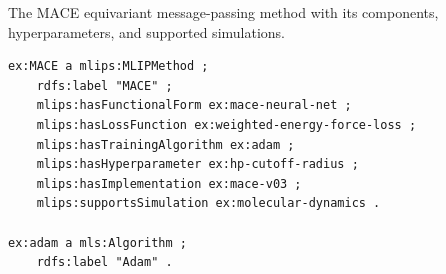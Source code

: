 The MACE equivariant message-passing method with its components, hyperparameters, and supported simulations.
\begin{lstlisting}[language=turtle]
ex:MACE a mlips:MLIPMethod ;
    rdfs:label "MACE" ;
    mlips:hasFunctionalForm ex:mace-neural-net ;
    mlips:hasLossFunction ex:weighted-energy-force-loss ;
    mlips:hasTrainingAlgorithm ex:adam ;
    mlips:hasHyperparameter ex:hp-cutoff-radius ;
    mlips:hasImplementation ex:mace-v03 ;
    mlips:supportsSimulation ex:molecular-dynamics .

ex:adam a mls:Algorithm ;
    rdfs:label "Adam" .
\end{lstlisting}
